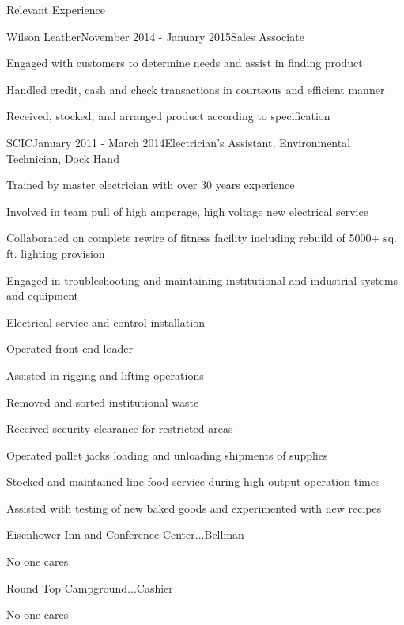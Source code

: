 \documentclass{resume} %
\begin{document}
\begin{rSection}{Relevant Experience}
\begin{rWorkSubsection}{Wilson Leather}{November 2014 - January 2015}{Sales Associate}{}
\item Engaged with customers to determine needs and assist in finding product
\item Handled credit, cash and check transactions in courteous and efficient manner
\item Received, stocked, and arranged product according to specification
\end{rWorkSubsection}


\begin{rWorkSubsection}{SCIC}{January 2011 - March 2014}{Electrician's Assistant, Environmental Technician, Dock Hand}{}
\item Trained by master electrician with over 30 years experience
\item Involved in team pull of high amperage, high voltage new electrical service
\item Collaborated on complete rewire of fitness facility including rebuild of 5000+ sq. ft. lighting provision
\item Engaged in troubleshooting and maintaining institutional and industrial systems and equipment
\item Electrical service and control installation
\item Operated front-end loader
\item Assisted in rigging and lifting operations
\item Removed and sorted institutional waste
\item Received security clearance for restricted areas
\item Operated pallet jacks loading and unloading shipments of supplies
\item Stocked and maintained line food service during high output operation times
\item Assisted with testing of new baked goods and experimented with new recipes
\end{rWorkSubsection}


\begin{rWorkSubsection}{Eisenhower Inn and Conference Center}{...}{Bellman}{}
\item No one cares
\end{rWorkSubsection}


\begin{rWorkSubsection}{Round Top Campground}{...}{Cashier}{}
\item No one cares
\end{rWorkSubsection}
\fi
\end{rSection}
\end{document}
